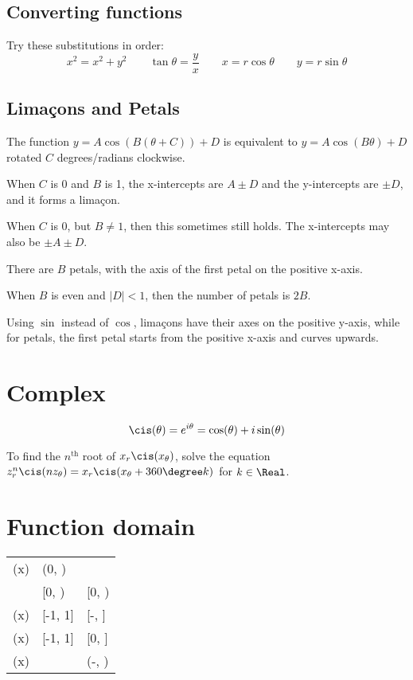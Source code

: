 \subsection{Converting functions}

Try these substitutions in order:
\[
	x^2 = x^2 + y^2 \qquad \tan\theta = \frac{y}{x} \qquad
	x = r\cos\theta \qquad y = r\sin\theta
\]
\subsection{Limaçons and Petals}

The function $y = A \cos(B(\theta + C)) + D$ is equivalent to $y = A \cos(B\theta) + D$ rotated $C$ degrees/radians clockwise.

When $C$ is 0 and $B$ is 1, the x-intercepts are $A \pm D$ and the y-intercepts are $\pm D$, and it forms a limaçon.

When $C$ is 0, but $B \neq 1$, then this sometimes still holds. The x-intercepts may also be $\pm A \pm D$.

There are $B$ petals, with the axis of the first petal on the positive x-axis.

When $B$ is even and $|D| < 1$, then the number of petals is $2B$.

Using $\sin$ instead of $\cos$, limaçons have their axes on the positive y-axis, while for petals, the first petal starts from the positive x-axis and curves upwards.

\section{Complex}

\[
	\cis(\theta) = e^{i\theta} = \cos(\theta) + i \sin(\theta)
\]

To find the $n^{\text{th}}$ root of $x_r \cis(x_{\theta})$, solve the equation $z_r^n \cis(nz_{\theta}) = x_r \cis(x_{\theta} + 360\degree k)$ for $k \in \Real$.

\section{Function domain}

\begin{center}
	\begin{tabular}{L L L} 
		 &  &  \\ 
		\hline
		\log(x) & (0, \infty) & \Real \\
		 & [0, \infty) & [0, \infty) \\
		\arcsin(x) & [-1, 1] & [-, ] \\
		\arccos(x) & [-1, 1] & [0, \pi] \\
		\arctan(x) & \Real & (-, ) \\
	\end{tabular}
\end{center}